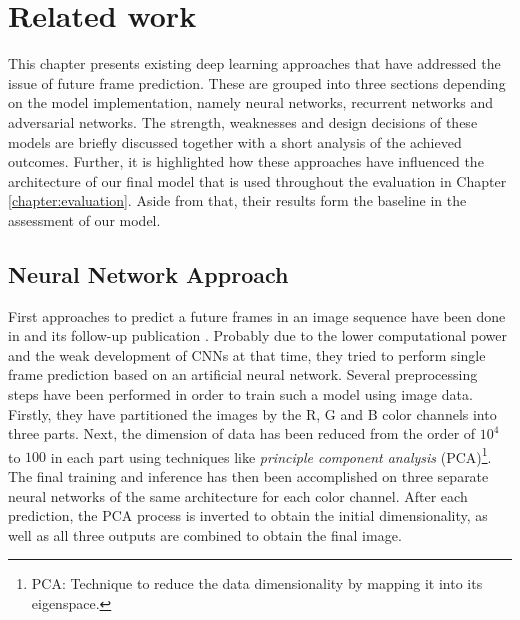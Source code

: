 
\chapter{Related work}  \label{chapter:relatedwork}

This chapter presents existing deep learning approaches that have addressed the issue of future frame prediction. These are grouped into three sections depending on the model implementation, namely neural networks, recurrent networks and adversarial networks. The strength, weaknesses and design decisions of these models are briefly discussed together with a short analysis of the achieved outcomes. Further, it is highlighted how these approaches have influenced the architecture of our final model that is used throughout the evaluation in Chapter \ref{chapter:evaluation}. Aside from that, their results form the baseline in the assessment of our model.


\section{Neural Network Approach}

First approaches to predict a future frames in an image sequence have been done in \parencite{ann} and its follow-up publication \parencite{ann2}. Probably due to the lower computational power and the weak development of CNNs at that time, they tried to perform single frame prediction based on an artificial neural network. Several preprocessing steps have been performed in order to train such a model using image data. Firstly, they have partitioned the images by the R, G and B color channels into three parts. Next, the dimension of data has been reduced from the order of $10^4$ to $100$ in each part using techniques like \textit{principle component analysis} (PCA)\footnote{PCA: Technique to reduce the data dimensionality by mapping it into its eigenspace.}. The final training and inference has then been accomplished on three separate neural networks of the same architecture for each color channel. After each prediction, the PCA process is inverted to obtain the initial dimensionality, as well as all three outputs are combined to obtain the final image.

